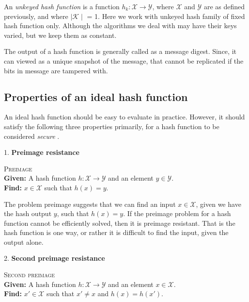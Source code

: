 An \emph{unkeyed hash function} is a function $h_{k}: \mathcal{X} \to \mathcal{Y}$, where $\mathcal{X}$ and
$\mathcal{Y}$ are as defined previously, and where $\mid\mathcal{K}\mid$ = 1. 
Here we work with unkeyed hash family of fixed hash function only. Although the algorithms
we deal with may have their keys varied, but we keep them as constant.

The output of a hash function is generally called as a message digest. Since, it can viewed as a unique
snapshot of the message, that cannot be replicated if the bits in message are tampered with.
  
\subsection{Properties of an ideal hash function}
An ideal hash function should be easy to evaluate in practice. However, it should satisfy the following
three properties primarily, for a hash function to be considered \emph{secure} \cite{00005}.

1. {\bf Preimage resistance}
\begin{center}
  \framebox
  {
    \parbox{300pt}
    {
      \centering \textsc{Preimage} \\
      {\bf Given:} A hash function $h : \mathcal{X} \to \mathcal{Y}$ and an element $y \in \mathcal{Y}$. \\
      {\bf Find:} $x \in \mathcal{X}$ such that $h(x) = y$. 
    }
  }
\end{center}
\vspace{4mm}

The problem preimage suggests that we can find an input $x \in \mathcal{X}$, given we have the hash 
output $y$, such that $h(x) = y$. If the preimage problem for a hash function cannot be efficiently
solved, then it is preimage resistant. That is the hash function is one way, or rather it is difficult
to find the input, given the output alone.

2. {\bf Second preimage resistance}
\begin{center}
  \framebox
  {
    \parbox{300pt}
    {
      \centering \textsc{Second preimage} \\
      {\bf Given:} A hash function $h : \mathcal{X} \to \mathcal{Y}$ and an element $x \in \mathcal{X}$. \\
      {\bf Find:} $x' \in \mathcal{X}$ such that $x' \neq x$ and $h(x) = h(x')$. 
    }
  }
\end{center}
\vspace{4mm}


